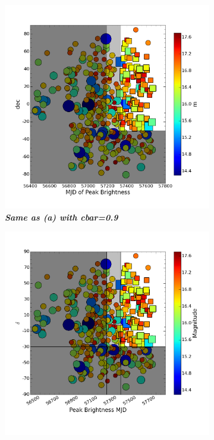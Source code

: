 \begin{figure}
\begin{subfigure}{.5\textwidth}
			\includegraphics[width=1\linewidth]{figures/variations/invert_mag_shrink_9.png}
		\caption{\it \small{{\bf Same as (a) with cbar=0.9}}}
		\label{fig:var2}
	\end{subfigure}
	\begin{subfigure}{.5\textwidth}
	  \centering
	  \includegraphics[width=1\linewidth]{figures/variations/shapes_invmag_fmt_vars.png}

\end{subfigure}
\end{figure}
